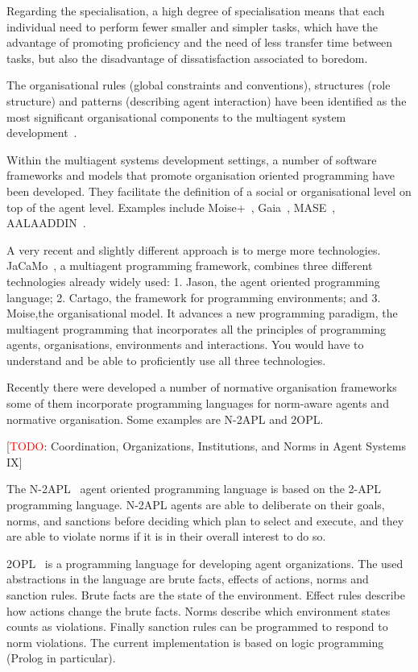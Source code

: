 \documentclass[a4paper,12pt,oneside,fleqn]{book} %
\newcommand{\todo}[1]{[\textcolor{red}{TODO}: #1]}
\begin{document}
Regarding the specialisation, a high degree of specialisation means that
each individual need to perform fewer smaller and simpler tasks, which have
the advantage of promoting proficiency and the need of less transfer time
between tasks, but also the disadvantage of dissatisfaction associated to
boredom.

The organisational rules (global constraints and conventions), structures
(role structure) and patterns (describing agent interaction) have been
identified as the most significant organisational components to the
multiagent system development~\cite{DBLP:conf/aose/ZambonelliJW00}.

Within the multiagent systems development settings, a number of
software frameworks and models that promote organisation oriented
programming have been developed. They facilitate the definition
of a social or organisational level on top of the agent level. Examples
include Moise+~\cite{DBLP:conf/atal/HubnerSB02},
Gaia~\cite{DBLP:journals/aamas/WooldridgeJK00},
MASE~\cite{deloach2001analysis}, AALAADDIN~\cite{ferber1998meta}.  

A very recent and slightly different approach is to merge more
technologies. JaCaMo~\cite{}, a multiagent programming framework, combines
three different technologies already widely used: 1. Jason, the agent
oriented programming language; 2. Cartago, the framework for programming
environments; and 3. Moise,the organisational model. It advances a new
programming paradigm, the multiagent programming that incorporates all the
principles of programming agents, organisations, environments and
interactions. You would have to understand and be able to proficiently use
all three technologies.

Recently there were developed a number of normative organisation frameworks
some of them incorporate programming languages for norm-aware agents and
normative organisation. Some examples are N-2APL and 2OPL.

\todo{Coordination, Organizations, Institutions, and Norms in Agent
Systems IX}

The N-2APL~\cite{} agent oriented programming language is based on the 2-APL
programming language. N-2APL agents are able to deliberate on their goals,
norms, and sanctions before deciding which plan to select and execute, and
they are able to violate norms if it is in their overall interest to do so.

2OPL~\cite{} is a programming language for developing agent organizations.
The used abstractions in the language are brute facts, effects of actions,
norms and sanction rules. Brute facts are the state of the environment.
Effect rules describe how actions change the brute facts. Norms describe
which environment states counts as violations.  Finally sanction rules can
be programmed to respond to norm violations. The current implementation is
based on logic programming (Prolog in particular).
\end{document}
